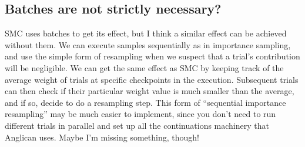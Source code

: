 \documentclass[a4paper, 11pt]{article}
\theoremstyle{definition}
\begin{document}
\subsection*{Batches are not strictly necessary?}

SMC uses batches to get its effect, but I think a similar effect can be achieved without them. We can execute samples sequentially as in importance sampling, and use the simple form of resampling when we suspect that a trial's contribution will be negligible. We can get the same effect as SMC by keeping track of the average weight of trials at specific checkpoints in the execution. Subsequent trials can then check if their particular weight value is much smaller than the average, and if so, decide to do a resampling step. This form of ``sequential importance resampling'' may be much easier to implement, since you don't need to run different trials in parallel and set up all the continuations machinery that Anglican uses. Maybe I'm missing something, though!



\end{document}
